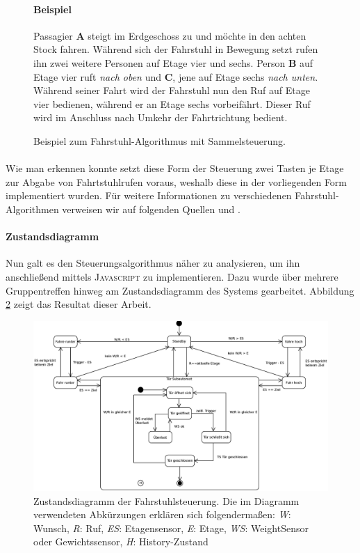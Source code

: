 \begin{figure}[h]
\begin{minipage}{0.47\textwidth}
		\paragraph{Beispiel}
		Passagier \textbf{A} steigt im Erdgeschoss zu und möchte in den achten Stock fahren. Während sich der Fahrstuhl in Bewegung setzt rufen ihn zwei weitere Personen auf Etage vier und sechs. Person \textbf{B} auf Etage vier ruft \textit{nach oben} und \textbf{C}, jene auf Etage sechs \textit{nach unten}.\\
		Während seiner Fahrt wird der Fahrstuhl nun den Ruf auf Etage vier bedienen, während er an Etage sechs vorbeifährt. Dieser Ruf wird im Anschluss nach Umkehr der Fahrtrichtung bedient.
	\end{minipage}
	\caption{Beispiel zum Fahrstuhl-Algorithmus mit Sammel\-steuerung.}
	\label{algo_exam}
\end{figure}

\paragraph{}Wie man erkennen konnte setzt diese Form der Steuerung zwei Tasten je Etage zur Abgabe von Fahrtstuhlrufen voraus, weshalb diese in der vorliegenden Form implementiert wurden. Für weitere Informationen zu verschiedenen Fahrstuhl-Algorithmen verweisen wir auf folgenden Quellen \cite{wiki_elev} und \cite{wiki_elev_2}.

\newpage
\paragraph{Zustandsdiagramm}Nun galt es den Steuerungsalgorithmus näher zu analysieren, um ihn anschließend mittels \textsc{Javascript} zu implementieren. Dazu wurde über mehrere Gruppentreffen hinweg am Zustandsdiagramm des Systems gearbeitet. Abbildung \ref{ZD} zeigt das Resultat dieser Arbeit.

\begin{figure}[h]
	\hspace*{-2.0cm}
	\includegraphics[width=1.3\textwidth]{images/ZDv6.eps}
	\caption{Zustandsdiagramm der Fahrstuhlsteuerung. Die im Diagramm verwendeten Abkürzungen erklären sich folgendermaßen: \textit{W}: Wunsch, \textit{R}: Ruf, \textit{ES}: Etagensensor, \textit{E}: Etage, \textit{WS}: WeightSensor oder Gewichtssensor, \textit{H}: History-Zustand}
	\label{ZD}
\end{figure}


